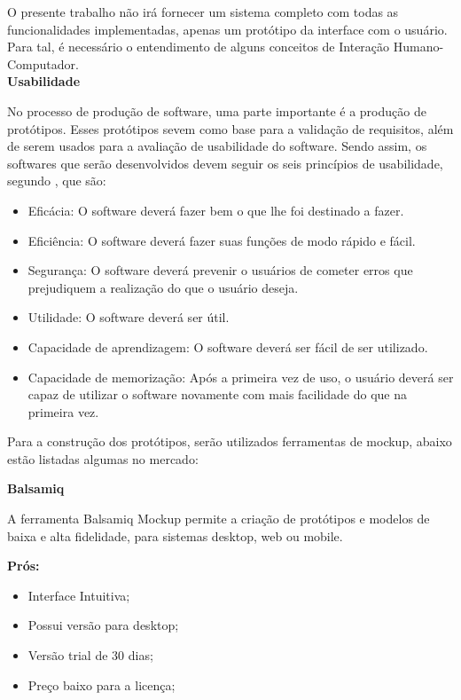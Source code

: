   
  O presente trabalho não irá fornecer um sistema completo com todas as funcionalidades implementadas,
  apenas um protótipo da interface com o usuário. Para tal, é necessário o entendimento de alguns conceitos de
  Interação Humano-Computador.\\
  
  \noindent
  \textbf{Usabilidade}
  
  No processo de produção de software, uma parte importante é a produção de protótipos. Esses protótipos sevem
  como base para a validação de requisitos, além de serem usados para a avaliação de usabilidade do software.
  Sendo assim, os softwares que serão desenvolvidos devem seguir os seis princípios de usabilidade, segundo \cite{preece02}, que são:
 
 \begin{itemize}
  \item Eficácia: O software deverá fazer bem o que lhe foi destinado a fazer.
  \item Eficiência: O software deverá fazer suas funções de modo rápido e fácil.
  \item Segurança: O software deverá prevenir o usuários de cometer erros que prejudiquem a realização do que o usuário deseja.
  \item Utilidade: O software deverá ser útil.
  \item Capacidade de aprendizagem: O software deverá ser fácil de ser utilizado.
  \item Capacidade de memorização: Após a primeira vez de uso, o usuário deverá ser capaz de utilizar o software novamente com mais facilidade do que na primeira vez.
 \end{itemize}
 
	Para a construção dos protótipos, serão utilizados ferramentas de mockup, abaixo estão listadas algumas no mercado:
     
\begin{center}
\textbf{Balsamiq}
\end{center}	

	A ferramenta Balsamiq Mockup permite a criação de protótipos e modelos de baixa e alta fidelidade,
	para sistemas desktop, web ou mobile.
	
\textbf{Prós:}
	
\begin{itemize}
  \item Interface Intuitiva;
  \item Possui versão para desktop;
  \item Versão trial de 30 dias;
  \item Preço baixo para a licença;
 \end{itemize}
 
